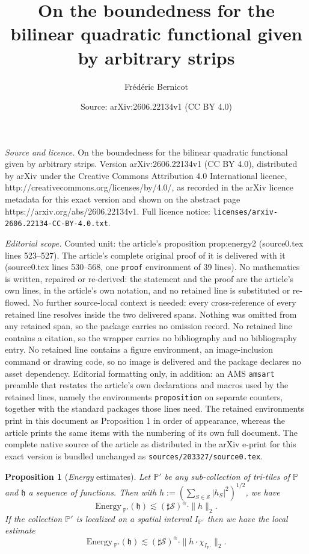 \documentclass[10pt,a4paper]{amsart}
\title{On the boundedness for the bilinear quadratic functional given by arbitrary strips}
\author{Fr\'ed\'eric Bernicot}
\date{Source: arXiv:2606.22134v1 (CC BY 4.0)}
\newtheorem{proposition}{Proposition}
\newcommand{\PP}{\mathbb{P}}
\newcommand{\energy}{\mathrm{Energy \,}}
\newcommand{\hh}{\mathfrak{h}}
\begin{document}
\maketitle

\noindent\emph{Source and licence.} On the boundedness for the bilinear quadratic functional given by arbitrary strips. Version arXiv:2606.22134v1 (CC BY 4.0), distributed by arXiv under the Creative Commons Attribution 4.0 International licence, http://creativecommons.org/licenses/by/4.0/, as recorded in the arXiv licence metadata for this exact version and shown on the abstract page https://arxiv.org/abs/2606.22134v1. Full licence notice: \texttt{licenses/arxiv-2606.22134-CC-BY-4.0.txt}.\par\smallskip

\noindent\textit{Editorial scope.} Counted unit: the article's proposition prop:energy2 (source0.tex lines 523--527). The article's complete original proof of it is delivered with it (source0.tex lines 530--568, one \texttt{proof} environment of 39 lines). No mathematics is written, repaired or re-derived: the statement and the proof are the article's own lines, in the article's own notation, and no retained line is substituted or re-flowed.  No further source-local context is needed: every cross-reference of every retained line resolves inside the two delivered spans.  Nothing was omitted from any retained span, so the package carries no omission record.  No retained line contains a citation, so the wrapper carries no bibliography and no bibliography entry.  No retained line contains a figure environment, an image-inclusion command or drawing code, so no image is delivered and the package declares no asset dependency.  Editorial formatting only, in addition: an AMS \texttt{amsart} preamble that restates the article's own declarations and macros used by the retained lines, namely the environments \texttt{proposition} on separate counters, together with the standard packages those lines need.  The retained environments print in this document as Proposition 1 in order of appearance, whereas the article prints the same items with the numbering of its own full document.  The complete native source of the article as distributed in the arXiv e-print for this exact version is bundled unchanged as \texttt{sources/203327/source0.tex}.
\begin{proposition}[{\it Energy} estimates] \label{prop:energy2} Let $\PP'$ be any sub-collection of tri-tiles of $\PP$ and $\hh$ a sequence of functions. Then with $h:=(\sum_{S\in {\mathcal S}} |h_S|^2)^{1/2}$, we have
$$ \energy_{\PP'}(\hh) \lesssim  (\sharp {\mathcal S})^{\alpha} \cdot \|h\|_2.$$
If the collection $\PP'$ is localized on a spatial interval $I_{\PP'}$ then we have the local estimate
$$ \energy_{\PP'}(\hh) \lesssim  (\sharp {\mathcal S})^{\alpha} \cdot \|h \cdot \chi_{I_{\PP'}}\|_2.$$
\end{proposition}
\end{document}
